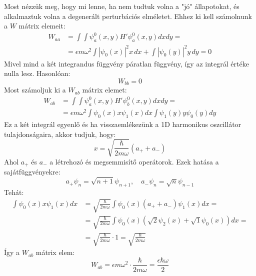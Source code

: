 \documentclass[../main.tex]{subfiles}
\begin{document}
Most nézzük meg, hogy mi lenne, ha nem tudtuk volna a "jó" állapotokat, és alkalmaztuk volna a degenerált perturbációs elméletet. Ehhez ki kell számolnunk a $W$ mátrix elemeit:
\begin{equation}
    \begin{aligned}
        W_{aa} &= \int \int \psi_a^{0} (x,y) H' \psi_a^0 (x,y) dx dy = \\
        &= \epsilon m \omega^2 \int |\psi_0 (x)|^2 x \, dx + \int |\psi_0 (y)|^2 y \, dy = 0
    \end{aligned}
\end{equation}
Mivel mind a két integrandus függvény páratlan függvény, így az integrál értéke nulla lesz. Hasonlóan:
\begin{equation}
    W_{bb} = 0
\end{equation}
Most számoljuk ki a $W_{ab}$ mátrix elemet:
\begin{equation}
    \begin{aligned}
        W_{ab} &= \int \int \psi_a^{0} (x,y) H' \psi_b^0 (x,y) dx dy = \\
        &= \epsilon m \omega^2 \int \psi_0 (x) x \psi_1 (x) dx \int \psi_1 (y) y \psi_0 (y) dy
    \end{aligned}
\end{equation}
Ez a két integrál egyenlő és ha visszaemlékezünk a 1D harmonikus oszcillátor tulajdonságaira, akkor tudjuk, hogy:
\begin{equation}
    x = \sqrt{\frac{\hbar}{2 m \omega}} (a_+ + a_-)
\end{equation}
Ahol $a_+$ és $a_-$ a létrehozó és megsemmisítő operátorok. Ezek hatása a sajátfüggvényekre:
\begin{equation}
    a_+ \psi_n = \sqrt{n+1} \psi_{n+1}, \quad a_- \psi_n = \sqrt{n} \psi_{n-1}
\end{equation}
Tehát:
\begin{equation}
    \begin{aligned}
        \int \psi_0 (x) x \psi_1 (x) dx &= \sqrt{\frac{\hbar}{2 m \omega}} \int \psi_0 (x) (a_+ + a_-) \psi_1 (x) dx = \\
        &= \sqrt{\frac{\hbar}{2 m \omega}} \int \psi_0 (x) \left( \sqrt{2} \psi_2 (x) + \sqrt{1} \psi_0 (x) \right) dx = \\
        &= \sqrt{\frac{\hbar}{2 m \omega}} \cdot 1 = \sqrt{\frac{\hbar}{2 m \omega}}
    \end{aligned}
\end{equation}
Így a $W_{ab}$ mátrix elem:
\begin{equation}
    W_{ab} = \epsilon m \omega^2 \cdot \frac{\hbar}{2 m \omega} = \frac{\epsilon \hbar \omega}{2}
\end{equation}
\end{document}
